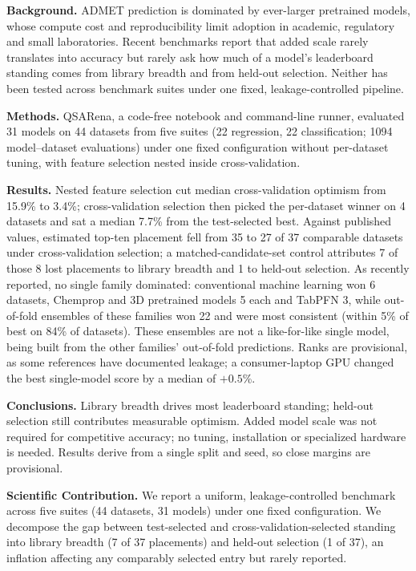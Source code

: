 \textbf{Background.} ADMET prediction is dominated by ever-larger pretrained models, whose compute cost and reproducibility limit adoption in academic, regulatory and small laboratories. Recent benchmarks report that added scale rarely translates into accuracy but rarely ask how much of a model's leaderboard standing comes from library breadth and from held-out selection. Neither has been tested across benchmark suites under one fixed, leakage-controlled pipeline.

\textbf{Methods.} QSARena, a code-free notebook and command-line runner, evaluated 31 models on 44 datasets from five suites (22 regression, 22 classification; 1094 model--dataset evaluations) under one fixed configuration without per-dataset tuning, with feature selection nested inside cross-validation.

\textbf{Results.} Nested feature selection cut median cross-validation optimism from 15.9\% to 3.4\%; cross-validation selection then picked the per-dataset winner on 4 datasets and sat a median 7.7\% from the test-selected best. Against published values, estimated top-ten placement fell from 35 to 27 of 37 comparable datasets under cross-validation selection; a matched-candidate-set control attributes 7 of those 8 lost placements to library breadth and 1 to held-out selection. As recently reported, no single family dominated: conventional machine learning won 6 datasets, Chemprop and 3D pretrained models 5 each and TabPFN 3, while out-of-fold ensembles of these families won 22 and were most consistent (within 5\% of best on 84\% of datasets). These ensembles are not a like-for-like single model, being built from the other families' out-of-fold predictions. Ranks are provisional, as some references have documented leakage; a consumer-laptop GPU changed the best single-model score by a median of $+0.5$\%.

\textbf{Conclusions.} Library breadth drives most leaderboard standing; held-out selection still contributes measurable optimism. Added model scale was not required for competitive accuracy; no tuning, installation or specialized hardware is needed. Results derive from a single split and seed, so close margins are provisional.

\textbf{Scientific Contribution.} We report a uniform, leakage-controlled benchmark across five suites (44 datasets, 31 models) under one fixed configuration. We decompose the gap between test-selected and cross-validation-selected standing into library breadth (7 of 37 placements) and held-out selection (1 of 37), an inflation affecting any comparably selected entry but rarely reported.

